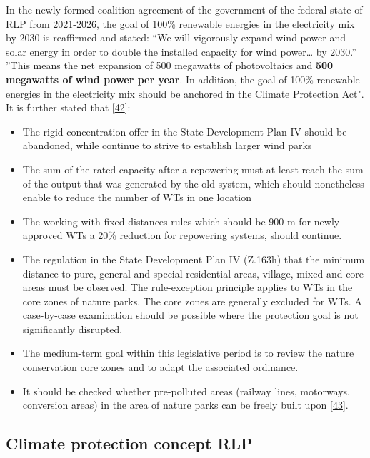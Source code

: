 \documentclass[a4paper,11pt]{article}
\providecommand{\tightlist}{%
  \setlength{\itemsep}{0pt}\setlength{\parskip}{0pt}}
\begin{document}
In the newly formed coalition agreement of the government of the federal state of RLP from 2021-2026, the goal of 100\% renewable energies in the electricity mix by 2030 is reaffirmed and stated: ``We will vigorously expand wind power and solar energy in order to double the installed capacity for wind power\ldots{} by 2030.'' ''This means the net expansion of 500 megawatts of photovoltaics and \textbf{500 megawatts of wind power per year}. In addition, the goal of 100\% renewable energies in the electricity mix should be anchored in the Climate Protection Act". It is further stated that {[}\protect\hyperlink{ref-FachagenturWindenergieanLand.2020}{42}{]}:
\begin{itemize}
\tightlist
\item
  The rigid concentration offer in the State Development Plan IV should be abandoned, while continue to strive to establish larger wind parks
\item
  The sum of the rated capacity after a repowering must at least reach the sum of the output that was generated by the old system, which should nonetheless enable to reduce the number of WTs in one location
\item
  The working with fixed distances rules which should be 900 m for newly approved WTs a 20\% reduction for repowering systems, should continue.
\item
  The regulation in the State Development Plan IV (Z.163h) that the minimum distance to pure, general and special residential areas, village, mixed and core areas must be observed. The rule-exception principle applies to WTs in the core zones of nature parks. The core zones are generally excluded for WTs. A case-by-case examination should be possible where the protection goal is not significantly disrupted.
\item
  The medium-term goal within this legislative period is to review the nature conservation core zones and to adapt the associated ordinance.
\item
  It should be checked whether pre-polluted areas (railway lines, motorways, conversion areas) in the area of nature parks can be freely built upon {[}\protect\hyperlink{ref-SPD.2021}{43}{]}.
\end{itemize}
\hypertarget{climate-protection-concept-rlp}{%
\subsection{Climate protection concept RLP}\label{climate-protection-concept-rlp}}
\end{document}
